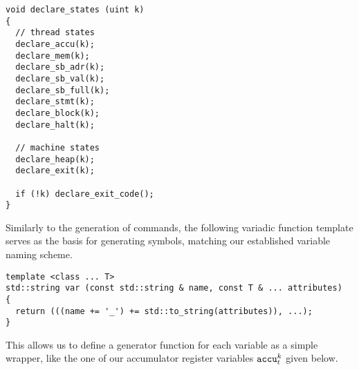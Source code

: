 \begin{lstlisting}[style=c++]
void declare_states (uint k)
{
  // thread states
  declare_accu(k);
  declare_mem(k);
  declare_sb_adr(k);
  declare_sb_val(k);
  declare_sb_full(k);
  declare_stmt(k);
  declare_block(k);
  declare_halt(k);

  // machine states
  declare_heap(k);
  declare_exit(k);

  if (!k) declare_exit_code();
}
\end{lstlisting}


%

\noindent
Similarly to the generation of \SMTLIB{} commands, the following variadic function template serves as the basis for generating symbols, matching our established variable naming scheme.

\begin{lstlisting}[style=c++]
template <class ... T>
std::string var (const std::string & name, const T & ... attributes)
{
  return (((name += '_') += std::to_string(attributes)), ...);
}
\end{lstlisting}

\noindent
This allows us to define a generator function for each variable as a simple wrapper, %
like the one of our accumulator register variables $\texttt{accu}^k_t$ given below.



